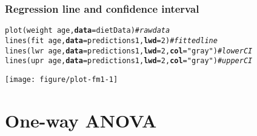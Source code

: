 \documentclass[color=usenames,dvipsnames]{beamer}\usepackage[]{graphicx}\usepackage[]{color}
\makeatletter
\newcommand{\hlnum}[1]{\textcolor[rgb]{0.69,0.494,0}{#1}}%
\newcommand{\hlstr}[1]{\textcolor[rgb]{0.749,0.012,0.012}{#1}}%
\newcommand{\hlcom}[1]{\textcolor[rgb]{0.514,0.506,0.514}{\textit{#1}}}%
\newcommand{\hlopt}[1]{\textcolor[rgb]{0,0,0}{#1}}%
\newcommand{\hlstd}[1]{\textcolor[rgb]{0,0,0}{#1}}%
\newcommand{\hlkwc}[1]{\textcolor[rgb]{0,0,0}{\textbf{#1}}}%
\newcommand{\hlkwd}[1]{\textcolor[rgb]{0.004,0.004,0.506}{#1}}%
\newenvironment{kframe}{%
 \def\at@end@of@kframe{}%
 \ifinner\ifhmode%
  \def\at@end@of@kframe{\end{minipage}}%
  \begin{minipage}{\columnwidth}%
 \fi\fi%
 \def\FrameCommand##1{\hskip\@totalleftmargin \hskip-\fboxsep
 \colorbox{shadecolor}{##1}\hskip-\fboxsep
     \hskip-\linewidth \hskip-\@totalleftmargin \hskip\columnwidth}%
 \MakeFramed {\advance\hsize-\width
   \@totalleftmargin\z@ \linewidth\hsize
   \@setminipage}}%
 {\par\unskip\endMakeFramed%
 \at@end@of@kframe}
\newenvironment{knitrout}{}{} %
\makeatother
\begin{document}
\begin{frame}[fragile]
  \frametitle{Regression line and confidence interval}
  \scriptsize
\begin{knitrout}\scriptsize
{}\color{fgcolor}\begin{kframe}
\begin{alltt}
\hlkwd{plot}\hlstd{(weight} \hlopt{~} \hlstd{age,} \hlkwc{data}\hlstd{=dietData)}                      \hlcom{# raw data}
\hlkwd{lines}\hlstd{(fit} \hlopt{~} \hlstd{age,} \hlkwc{data}\hlstd{=predictions1,} \hlkwc{lwd}\hlstd{=}\hlnum{2}\hlstd{)}             \hlcom{# fitted line}
\hlkwd{lines}\hlstd{(lwr} \hlopt{~} \hlstd{age,} \hlkwc{data}\hlstd{=predictions1,} \hlkwc{lwd}\hlstd{=}\hlnum{2}\hlstd{,} \hlkwc{col}\hlstd{=}\hlstr{"gray"}\hlstd{)} \hlcom{# lower CI}
\hlkwd{lines}\hlstd{(upr} \hlopt{~} \hlstd{age,} \hlkwc{data}\hlstd{=predictions1,} \hlkwc{lwd}\hlstd{=}\hlnum{2}\hlstd{,} \hlkwc{col}\hlstd{=}\hlstr{"gray"}\hlstd{)} \hlcom{# upper CI}
\end{alltt}
\end{kframe}
\end{knitrout}
  \vspace{-9mm}
  \begin{center}
    \texttt{[image: figure/plot-fm1-1]}
  \end{center}
\end{frame}



\section{One-way ANOVA}
\end{document}
